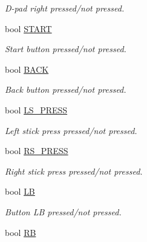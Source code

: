 \begin{DoxyCompactItemize}
\begin{DoxyCompactList}\small\item\em D-\/pad right pressed/not pressed. \end{DoxyCompactList}\item 
\hypertarget{structbutton_a991094a2cc72be82f14668a78f8c2cc6}{bool \hyperlink{structbutton_a991094a2cc72be82f14668a78f8c2cc6}{S\-T\-A\-R\-T}}\label{structbutton_a991094a2cc72be82f14668a78f8c2cc6}

\begin{DoxyCompactList}\small\item\em Start button pressed/not pressed. \end{DoxyCompactList}\item 
\hypertarget{structbutton_aa617d468aa600e2db0ace404b6d73362}{bool \hyperlink{structbutton_aa617d468aa600e2db0ace404b6d73362}{B\-A\-C\-K}}\label{structbutton_aa617d468aa600e2db0ace404b6d73362}

\begin{DoxyCompactList}\small\item\em Back button pressed/not pressed. \end{DoxyCompactList}\item 
\hypertarget{structbutton_a5e73bda0e232c16c3ccf8d4f64c28112}{bool \hyperlink{structbutton_a5e73bda0e232c16c3ccf8d4f64c28112}{L\-S\-\_\-\-P\-R\-E\-S\-S}}\label{structbutton_a5e73bda0e232c16c3ccf8d4f64c28112}

\begin{DoxyCompactList}\small\item\em Left stick press pressed/not pressed. \end{DoxyCompactList}\item 
\hypertarget{structbutton_a060553e2ecadce74e0f2a06990caeb9f}{bool \hyperlink{structbutton_a060553e2ecadce74e0f2a06990caeb9f}{R\-S\-\_\-\-P\-R\-E\-S\-S}}\label{structbutton_a060553e2ecadce74e0f2a06990caeb9f}

\begin{DoxyCompactList}\small\item\em Right stick press pressed/not pressed. \end{DoxyCompactList}\item 
\hypertarget{structbutton_ada81b06ca9633d27de104929011da3ec}{bool \hyperlink{structbutton_ada81b06ca9633d27de104929011da3ec}{L\-B}}\label{structbutton_ada81b06ca9633d27de104929011da3ec}

\begin{DoxyCompactList}\small\item\em Button L\-B pressed/not pressed. \end{DoxyCompactList}\item 
\hypertarget{structbutton_a6d7bc7609cc3e233e0044813780ab2d4}{bool \hyperlink{structbutton_a6d7bc7609cc3e233e0044813780ab2d4}{R\-B}}\label{structbutton_a6d7bc7609cc3e233e0044813780ab2d4}


\end{DoxyCompactItemize}
